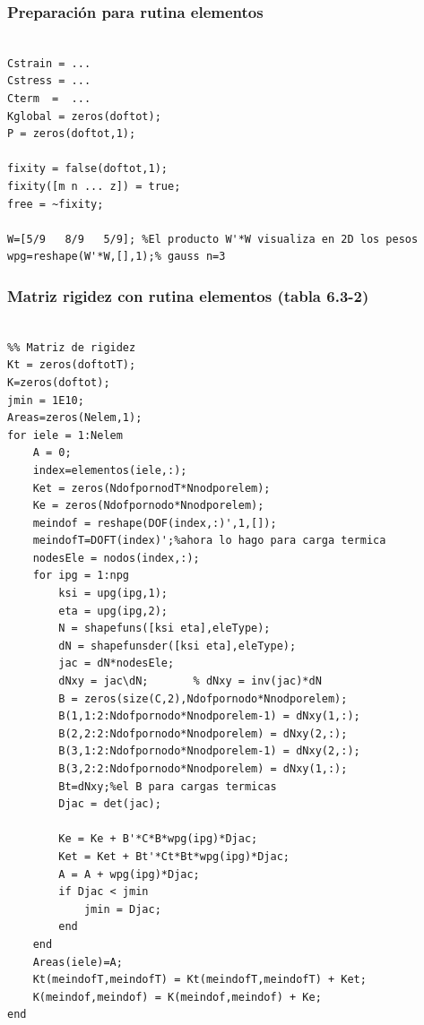 \subsubsection*{Preparación para rutina elementos}
\begin{code}
\begin{verbatim}
    
Cstrain = ...
Cstress = ...
Cterm  =  ...
Kglobal = zeros(doftot);
P = zeros(doftot,1); 

fixity = false(doftot,1);
fixity([m n ... z]) = true;
free = ~fixity;

W=[5/9   8/9   5/9]; %El producto W'*W visualiza en 2D los pesos
wpg=reshape(W'*W,[],1);% gauss n=3
\end{verbatim}
\end{code}

\clearpage
\subsubsection*{Matriz rigidez con rutina elementos (tabla 6.3-2)}
\begin{code}
\begin{verbatim}

%% Matriz de rigidez
Kt = zeros(doftotT);
K=zeros(doftot);
jmin = 1E10;
Areas=zeros(Nelem,1);
for iele = 1:Nelem
    A = 0;
    index=elementos(iele,:);
    Ket = zeros(NdofpornodT*Nnodporelem);
    Ke = zeros(Ndofpornodo*Nnodporelem);
    meindof = reshape(DOF(index,:)',1,[]);
    meindofT=DOFT(index)';%ahora lo hago para carga termica
    nodesEle = nodos(index,:);
    for ipg = 1:npg
        ksi = upg(ipg,1);
        eta = upg(ipg,2);
        N = shapefuns([ksi eta],eleType);
        dN = shapefunsder([ksi eta],eleType);
        jac = dN*nodesEle;
        dNxy = jac\dN;       % dNxy = inv(jac)*dN
        B = zeros(size(C,2),Ndofpornodo*Nnodporelem);
        B(1,1:2:Ndofpornodo*Nnodporelem-1) = dNxy(1,:);
        B(2,2:2:Ndofpornodo*Nnodporelem) = dNxy(2,:);
        B(3,1:2:Ndofpornodo*Nnodporelem-1) = dNxy(2,:);
        B(3,2:2:Ndofpornodo*Nnodporelem) = dNxy(1,:);
        Bt=dNxy;%el B para cargas termicas
        Djac = det(jac);
        
        Ke = Ke + B'*C*B*wpg(ipg)*Djac;
        Ket = Ket + Bt'*Ct*Bt*wpg(ipg)*Djac;
        A = A + wpg(ipg)*Djac;
        if Djac < jmin
            jmin = Djac;
        end
    end
    Areas(iele)=A;
    Kt(meindofT,meindofT) = Kt(meindofT,meindofT) + Ket;
    K(meindof,meindof) = K(meindof,meindof) + Ke;
end
\end{verbatim}
\end{code}
\clearpage
